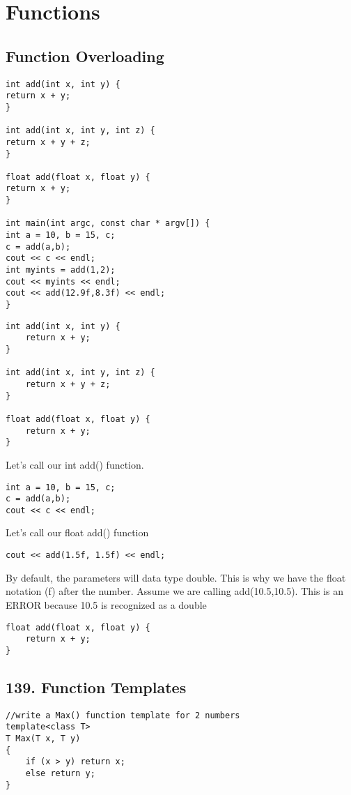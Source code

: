 \documentclass[a4paper,12pt]{book}
\begin{document}
\section{Functions}

\subsection{Function Overloading}


\begin{lstlisting}
int add(int x, int y) {
return x + y;
}

int add(int x, int y, int z) {
return x + y + z;
}

float add(float x, float y) {
return x + y;
}

int main(int argc, const char * argv[]) {
int a = 10, b = 15, c;
c = add(a,b);
cout << c << endl;
int myints = add(1,2);
cout << myints << endl;
cout << add(12.9f,8.3f) << endl;
}
\end{lstlisting}

\begin{lstlisting}
int add(int x, int y) {
	return x + y;
}

int add(int x, int y, int z) {
	return x + y + z;
}

float add(float x, float y) {
	return x + y;
}
\end{lstlisting}

Let's call our int add() function.
\begin{lstlisting}
int a = 10, b = 15, c;
c = add(a,b);
cout << c << endl;
\end{lstlisting}

Let's call our float add() function
\begin{lstlisting}
cout << add(1.5f, 1.5f) << endl;
\end{lstlisting}
By default, the parameters will data type double. This is why we have the float notation (f) after the number.
Assume we are calling add(10.5,10.5). This is an ERROR because 10.5 is recognized as a double

\begin{lstlisting}
float add(float x, float y) {
	return x + y;
}
\end{lstlisting}

\subsection{139. Function Templates}
\begin{lstlisting}
//write a Max() function template for 2 numbers
template<class T> 
T Max(T x, T y) 
{
	if (x > y) return x;
	else return y;
}
\end{lstlisting}
\end{document}
